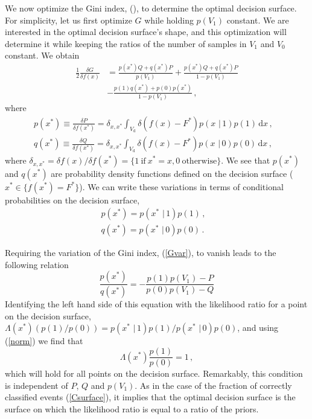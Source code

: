 \documentclass[prd, twocolumn, lengthcheck, superscriptaddress, showpacs, letterpaper, nofootinbib]{revtex4-1}
\newcommand\given{\,\,|\,}
\newcommand\auxvec{x}
\newcommand\Vdata{V_\mathrm{d}}
\newcommand\Ft{\ensuremath{F^\ast}}
\newcommand\auxvect{\auxvec^{\ast}}
\newcommand\pt{\ensuremath{p(\auxvect)}}
\newcommand\qt{\ensuremath{q(\auxvect)}}
\newcommand\pVg{\ensuremath{p(V_1)}}
\newcommand\diff{\, \mathrm{d}}
\begin{document}
We now optimize the Gini index, (), to determine the optimal decision surface. For simplicity, let us first optimize $G$ while holding $p(V_1)$ constant. We are interested in the optimal decision surface's shape, and this optimization will determine it while keeping the ratios of the number of samples in $V_1$ and $V_0$ constant. We obtain
\begin{align}
\label{Gvar}
\frac{1}{2}\frac{\delta G}{\delta f(\auxvec)} & =  \frac{\pt Q + \qt P}{\pVg} + \frac{\pt Q + \qt P}{1-\pVg}\nonumber \\
                                                 & - \frac{ p(1)\qt + p(0)\pt}{1-\pVg}\,,
\end{align}
where
\begin{subequations}
\label{PQvars}
\begin{align}
\pt \equiv \frac{\delta P}{\delta f(\auxvect)} =   \delta_{\auxvec, \auxvect} \int_{\Vdata}\! \delta\left(f(\auxvec) - \Ft\right)p(\auxvec \given 1)p(1) \diff \auxvec \,,&\\
\qt \equiv \frac{\delta Q}{\delta f(\auxvect)} =   \delta_{\auxvec, \auxvect} \int_{\Vdata}\! \delta\left(f(\auxvec) - \Ft\right)p(\auxvec \given 0)p(0) \diff \auxvec \,,
 \end{align}
\end{subequations}
where $\delta_{\auxvec, \auxvect} = \delta f(\auxvec)/\delta f(\auxvect) = \{1\mathrm{\ if\ } \auxvect=\auxvec, 0 \mathrm{\ otherwise}\}$. We see that $\pt$ and $\qt$ are probability density functions defined on the decision surface ($\auxvect \in \{f(\auxvect)=\Ft\}$). We can write these variations in terms of conditional probabilities on the decision surface,
\begin{subequations}
\label{pqt}
\begin{align}
\pt = p(\auxvect \given 1)p(1)  \,,&\\
\qt = p(\auxvect \given 0)p(0) \,.
\end{align}
\end{subequations}


Requiring the variation of the Gini index, (\ref{Gvar}), to vanish leads to the following relation
\begin{equation}
\label{eqforptqt}
\frac{\pt}{\qt} = - \frac{p(1)\pVg - P}{p(0)\pVg - Q}
\end{equation}
Identifying the left hand side of this equation with the likelihood ratio for a point on the decision surface, $\Lambda(\auxvect)(p(1)/p(0))  = p(\auxvect \given 1)p(1)/p(\auxvect \given 0)p(0)$, and using (\ref{norm}) we find that
\begin{equation}
\label{lrforG1}
\Lambda(\auxvect)\frac{p(1)}{p(0)} = 1 \,,
\end{equation}
which will hold for all points on the decision surface. Remarkably, this condition is independent of $P$, $Q$ and $\pVg$. As in the case of the fraction of correctly classified events (\ref{Csurface}), it implies that the optimal decision surface is the surface on which the likelihood ratio is equal to a ratio of the priors.
\end{document}
